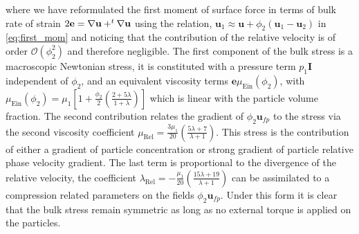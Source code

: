 where we have reformulated the first moment of surface force in terms of bulk rate of strain $2\textbf{e} = \mathbf{\nabla} \textbf{u} +  ^t \mathbf{\nabla} \textbf{u}$ using the relation, $\textbf{u}_1 \approx \textbf{u} + \phi_2 (\textbf{u}_1 - \textbf{u}_2)$ in \ref{eq:first_mom} and noticing that the contribution of the relative velocity is of order $\mathcal{O}(\phi_2^2)$ and therefore negligible. 
The first component of the bulk stress is a macroscopic Newtonian stress, it is constituted with a pressure term $p_1 \textbf{I}$ independent of $\phi_2$, and an equivalent viscosity terms $\textbf{e}\mu_\text{Ein}(\phi_2)$, with $\mu_\text{Ein}(\phi_2) = \mu_1\left[1 + \frac{\phi_2}{2} \left(\frac{2+5\lambda}{1+\lambda}\right)\right]$ which is linear with the particle volume fraction. 
The second contribution relates the gradient of $\phi_2 \textbf{u}_{fp}$ to the stress via the second viscosity coefficient $\mu_\text{Rel} = \frac{3 \mu_1 }{20}\left(\frac{5\lambda+7}{\lambda+1}\right)$.
This stress is the contribution of either a gradient of particle concentration or strong gradient of particle relative phase velocity gradient. 
The last term is proportional to the divergence of the relative velocity, the coefficient $\lambda_\text{Rel}= - \frac{\mu_1}{20}\left(\frac{15\lambda+19}{\lambda+1}\right)$ can be assimilated to a compression related parameters on the fields $\phi_2\textbf{u}_{fp}$. 
Under this form it is clear that the bulk stress remain symmetric as long as no external torque is applied on the particles. 

